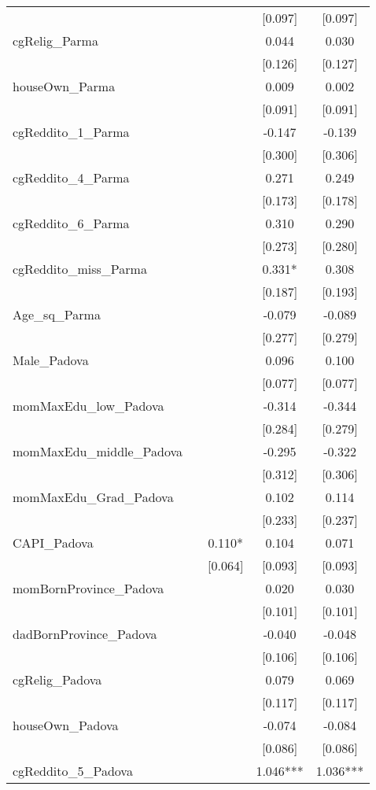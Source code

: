 \documentclass[]{article}
\begin{document}
\begin{tabular}{lcccc}
 &  &  & [0.097] & [0.097] \\
cgRelig\_Parma &  &  & 0.044 & 0.030 \\
 &  &  & [0.126] & [0.127] \\
houseOwn\_Parma &  &  & 0.009 & 0.002 \\
 &  &  & [0.091] & [0.091] \\
cgReddito\_1\_Parma &  &  & -0.147 & -0.139 \\
 &  &  & [0.300] & [0.306] \\
cgReddito\_4\_Parma &  &  & 0.271 & 0.249 \\
 &  &  & [0.173] & [0.178] \\
cgReddito\_6\_Parma &  &  & 0.310 & 0.290 \\
 &  &  & [0.273] & [0.280] \\
cgReddito\_miss\_Parma &  &  & 0.331* & 0.308 \\
 &  &  & [0.187] & [0.193] \\
Age\_sq\_Parma &  &  & -0.079 & -0.089 \\
 &  &  & [0.277] & [0.279] \\
Male\_Padova &  &  & 0.096 & 0.100 \\
 &  &  & [0.077] & [0.077] \\
momMaxEdu\_low\_Padova &  &  & -0.314 & -0.344 \\
 &  &  & [0.284] & [0.279] \\
momMaxEdu\_middle\_Padova &  &  & -0.295 & -0.322 \\
 &  &  & [0.312] & [0.306] \\
momMaxEdu\_Grad\_Padova &  &  & 0.102 & 0.114 \\
 &  &  & [0.233] & [0.237] \\
CAPI\_Padova &  & 0.110* & 0.104 & 0.071 \\
 &  & [0.064] & [0.093] & [0.093] \\
momBornProvince\_Padova &  &  & 0.020 & 0.030 \\
 &  &  & [0.101] & [0.101] \\
dadBornProvince\_Padova &  &  & -0.040 & -0.048 \\
 &  &  & [0.106] & [0.106] \\
cgRelig\_Padova &  &  & 0.079 & 0.069 \\
 &  &  & [0.117] & [0.117] \\
houseOwn\_Padova &  &  & -0.074 & -0.084 \\
 &  &  & [0.086] & [0.086] \\
cgReddito\_5\_Padova &  &  & 1.046*** & 1.036*** \\

\end{tabular}
\end{document}
